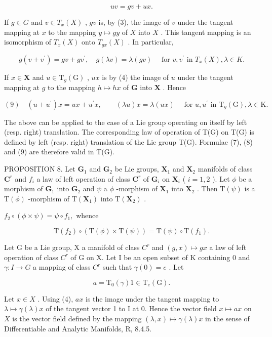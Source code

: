 \[
u v = g v + u x.\tag{7}
\]

If \(g \in G\) and \(v \in T_x(X)\) , \(gv\) is, by (3), the image of \(v\) under the tangent mapping at \(x\) to the mapping \(y \mapsto gy\) of \(X\) into \(X\) . This tangent mapping is an isomorphism of \(T_x(X)\) onto \(T_{gx}(X)\) . In particular,

\[
g (v + v ^ {\prime}) = g v + g v ^ {\prime}, \quad g (\lambda v) = \lambda (g v) \quad \text { for } v, v ^ {\prime} \text { in } T _ {x} (X), \lambda \in K.\tag{8}
\]

If \(x \in \mathbf{X}\) and \(u \in \mathrm{T}_g(\mathrm{G})\) , \(ux\) is by (4) the image of \(u\) under the tangent mapping at \(g\) to the mapping \(h \mapsto hx\) of \(\mathbf{G}\) into \(\mathbf{X}\) . Hence

\[
(9) \quad (u + u ^ {\prime}) x = u x + u ^ {\prime} x, \qquad (\lambda u) x = \lambda (u x) \quad \text { for } u, u ^ {\prime} \text { in } \mathrm{T} _ {g} (\mathrm{G}), \lambda \in \mathrm{K}.
\]

The above can be applied to the case of a Lie group operating on itself by left (resp. right) translation. The corresponding law of operation of T(G) on T(G) is defined by left (resp. right) translation of the Lie group T(G). Formulae (7), (8) and (9) are therefore valid in T(G).

PROPOSITION 8. Let \(\mathbf{G}_1\) and \(\mathbf{G}_2\) be Lie groups, \(\mathbf{X}_1\) and \(\mathbf{X}_2\) manifolds of class \(\mathbf{C}^r\) and \(f_i\) a law of left operation of class \(\mathbf{C}^r\) of \(\mathbf{G}_i\) on \(\mathbf{X}_i\) ( \(i = 1, 2\) ). Let \(\phi\) be a morphism of \(\mathbf{G}_1\) into \(\mathbf{G}_2\) and \(\psi\) a \(\phi\) -morphism of \(\mathbf{X}_1\) into \(\mathbf{X}_2\) . Then \(\mathrm{T}(\psi)\) is a \(\mathrm{T}(\phi)\) -morphism of \(\mathrm{T}(\mathbf{X}_1)\) into \(\mathrm{T}(\mathbf{X}_2)\) .

\(f_{2}\circ (\phi \times \psi) = \psi \circ f_{1},\) whence

\[
\mathrm{T} (f _ {2}) \circ (\mathrm{T} (\phi) \times \mathrm{T} (\psi)) = \mathrm{T} (\psi) \circ \mathrm{T} (f _ {1}).
\]

Let G be a Lie group, X a manifold of class \(C^{r}\) and \((g, x) \mapsto gx\) a law of left operation of class \(C^{r}\) of G on X. Let I be an open subset of K containing 0 and \(\gamma: I \to G\) a mapping of class \(C^{r}\) such that \(\gamma(0) = e\) . Let

\[
a = \mathrm{T} _ {0} (\gamma) 1 \in \mathrm{T} _ {e} (\mathrm{G}).
\]

Let \(x \in X\) . Using (4), \(ax\) is the image under the tangent mapping to \(\lambda \mapsto \gamma(\lambda)x\) of the tangent vector 1 to I at 0. Hence the vector field \(x \mapsto ax\) on \(X\) is the vector field defined by the mapping \((\lambda, x) \mapsto \gamma(\lambda)x\) in the sense of Differentiable and Analytic Manifolds, R, 8.4.5.
\relax{}
